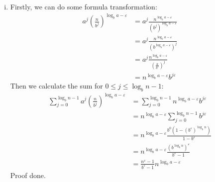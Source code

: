 \documentclass[12pt, a4paper]{article}
\begin{document}
\begin{enumerate}
\begin{enumerate}
\begin{enumerate}[i)]
            \item Firstly, we can do some formula transformation:
                  \begin{align*}
                      a^j(\frac{n}{b^j})^{\log_b a - \varepsilon} &= a^j \frac{n^{\log_b a - \varepsilon}}{(b^j)^{\log_b a - \varepsilon}}\\
                                                                  &= a^j \frac{n^{\log_b a - \varepsilon}}{(b^{\log_b a - \varepsilon})^j}\\
                                                                  &= a^j \frac{n^{\log_b a - \varepsilon}}{(\frac{a}{b^\varepsilon})^j}\\
                                                                  &= n^{\log_b a - \varepsilon}b^{j\varepsilon}
                  \end{align*}
                  Then we calculate the sum for $0 \leq j \leq \log_b n - 1$:
                  \begin{align*}
                      \sum_{j=0}^{\log_b n-1} a^j(\frac{n}{b^j})^{\log_b a-\varepsilon} &= \sum_{j=0}^{\log_b n-1} n^{\log_b a - \varepsilon}b^{j\varepsilon}\\
                                                                                        &= n^{\log_b a - \varepsilon}\sum_{j=0}^{\log_b n-1}b^{j\varepsilon}\\
                                                                                        &= n^{\log_b a - \varepsilon}\frac{b^0(1 - (b^\varepsilon)^{\log_b n})}{1 - b^\varepsilon}\\
                                                                                        &= n^{\log_b a - \varepsilon}\frac{(b^{\log_b n})^\varepsilon}{b^\varepsilon - 1}\\
                                                                                        &= \frac{n^\varepsilon - 1}{b^\varepsilon - 1}n^{\log_b a - \varepsilon}
                  \end{align*}
                  Proof done.


\end{enumerate}
\end{enumerate}
\end{enumerate}
\end{document}
